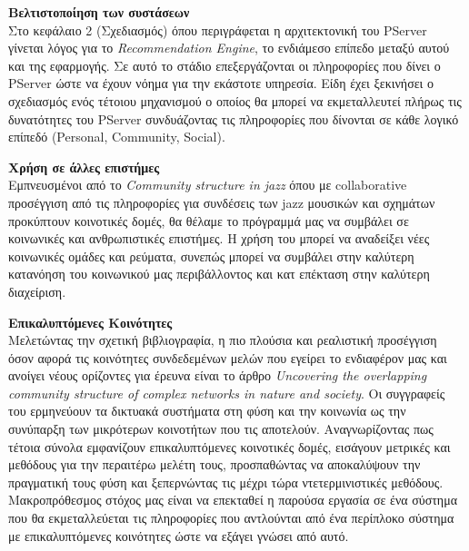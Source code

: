 \begin{description}
\item \textbf{Βελτιστοποίηση των συστάσεων}  \hfill \\
Στο κεφάλαιο 2 (Σχεδιασμός) όπου περιγράφεται η αρχιτεκτονική του PServer γίνεται λόγος για το \emph{Recommendation Engine}, το ενδιάμεσο επίπεδο μεταξύ αυτού και της εφαρμογής. 
Σε αυτό το στάδιο επεξεργάζονται οι πληροφορίες που δίνει ο PServer ώστε να έχουν νόημα για την εκάστοτε υπηρεσία. 
Είδη έχει ξεκινήσει ο σχεδιασμός ενός τέτοιου μηχανισμού ο οποίος θα μπορεί να εκμεταλλευτεί πλήρως τις δυνατότητες του PServer συνδυάζοντας τις πληροφορίες που δίνονται σε κάθε λογικό
επίπεδό (Personal, Community, Social).
\item \textbf{Χρήση σε άλλες επιστήμες}  \hfill \\
Εμπνευσμένοι από το \emph{Community structure in jazz}\cite{jazz} όπου με  collaborative  προσέγγιση από τις πληροφορίες για συνδέσεις των jazz μουσικών και σχημάτων προκύπτουν κοινοτικές
δομές, θα θέλαμε το πρόγραμμά μας να συμβάλει σε κοινωνικές και ανθρωπιστικές επιστήμες. Η χρήση του μπορεί να αναδείξει νέες κοινωνικές ομάδες και ρεύματα, συνεπώς μπορεί να συμβάλει
στην καλύτερη κατανόηση του κοινωνικού μας περιβάλλοντος και κατ επέκταση στην καλύτερη διαχείριση.
\item \textbf{Επικαλυπτόμενες Κοινότητες}  \hfill \\
Μελετώντας την σχετική βιβλιογραφία, η πιο πλούσια και ρεαλιστική προσέγγιση όσον αφορά τις κοινότητες συνδεδεμένων μελών που εγείρει το ενδιαφέρον μας και ανοίγει νέους ορίζοντες για έρευνα 
είναι το άρθρο \emph{Uncovering the overlapping community structure of complex networks in nature and society}\cite{overlapping}.
Οι συγγραφείς του ερμηνεύουν τα δικτυακά συστήματα στη φύση και την κοινωνία ως την συνύπαρξη των μικρότερων κοινοτήτων που τις αποτελούν. 
Αναγνωρίζοντας πως τέτοια σύνολα εμφανίζουν επικαλυπτόμενες κοινοτικές δομές, εισάγουν μετρικές και μεθόδους για την περαιτέρω μελέτη τους, προσπαθώντας να αποκαλύψουν την πραγματική τους φύση
και ξεπερνώντας τις μέχρι τώρα ντετερμινιστικές μεθόδους.
Μακροπρόθεσμος στόχος μας είναι να επεκταθεί η παρούσα εργασία σε ένα σύστημα που θα εκμεταλλεύεται τις πληροφορίες που αντλούνται από ένα περίπλοκο σύστημα με επικαλυπτόμενες
κοινότητες ώστε να εξάγει γνώσει από αυτό.
\end{description} 


